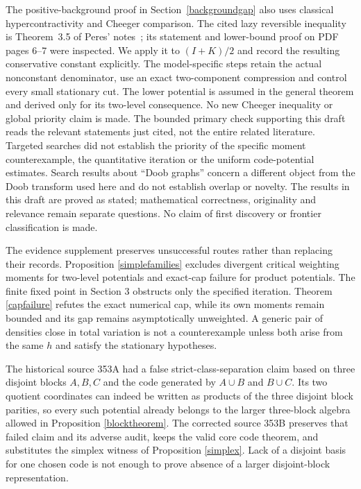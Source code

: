 \documentclass[11pt]{article}
\begin{document}
The positive-background proof in Section~\ref{backgroundgap} also uses classical hypercontractivity and Cheeger comparison. The cited lazy reversible inequality is Theorem~3.5 of Peres' notes~\cite{peres}; its statement and lower-bound proof on PDF pages 6--7 were inspected. We apply it to $(I+K)/2$ and record the resulting conservative constant explicitly. The model-specific steps retain the actual nonconstant denominator, use an exact two-component compression and control every small stationary cut. The lower potential is assumed in the general theorem and derived only for its two-level consequence. No new Cheeger inequality or global priority claim is made. The bounded primary check supporting this draft reads the relevant statements just cited, not the entire related literature. Targeted searches did not establish the priority of the specific moment counterexample, the quantitative iteration or the uniform code-potential estimates. Search results about ``Doob graphs'' concern a different object from the Doob transform used here and do not establish overlap or novelty. The results in this draft are proved as stated; mathematical correctness, originality and relevance remain separate questions. No claim of first discovery or frontier classification is made.

The evidence supplement preserves unsuccessful routes rather than replacing their records. Proposition \ref{simplefamilies} excludes divergent critical weighting moments for two-level potentials and exact-cap failure for product potentials. The finite fixed point in Section 3 obstructs only the specified iteration. Theorem \ref{capfailure} refutes the exact numerical cap, while its own moments remain bounded and its gap remains asymptotically unweighted. A generic pair of densities close in total variation is not a counterexample unless both arise from the same $h$ and satisfy the stationary hypotheses.

The historical source 353A had a false strict-class-separation claim based on three disjoint blocks $A,B,C$ and the code generated by $A\cup B$ and $B\cup C$. Its two quotient coordinates can indeed be written as products of the three disjoint block parities, so every such potential already belongs to the larger three-block algebra allowed in Proposition \ref{blocktheorem}. The corrected source 353B preserves that failed claim and its adverse audit, keeps the valid core code theorem, and substitutes the simplex witness of Proposition \ref{simplex}. Lack of a disjoint basis for one chosen code is not enough to prove absence of a larger disjoint-block representation.
\end{document}
